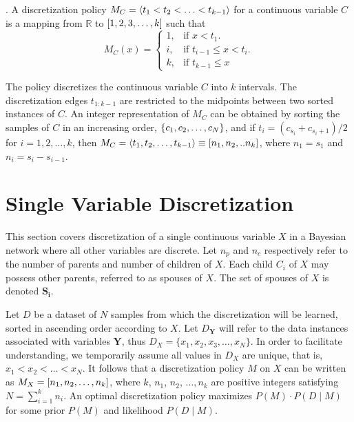 .
A discretization policy $M_C = \langle t_1 < t_2 < \ldots < t_{k-1} \rangle$ for a continuous variable $C$ is a mapping from $\mathbb{R}$ to $\brock{1,2,3,\ldots,k}$ such that
\begin{equation}
  M_C (x)=\begin{cases}
    1, & \text{if $x<t_1$}.\\
    i, & \text{if $t_{i-1} \leq x < t_i$}\text{.}\\
    k, & \text{if $t_{k-1} \leq x$}
  \end{cases}
\end{equation}

\noindent
The policy discretizes the continuous variable $C$ into $k$ intervals.
The discretization edges $t_{1:k-1}$ are restricted to the midpoints between two sorted instances of $C$.
An integer representation of $M_C$ can be obtained by sorting the samples of $C$ in an increasing order, $\curly{c_1,c_2,\ldots,c_N}$, and if $t_i = (c_{s_{i}} + c_{s_{i}+1})/2$ for $i=1,2,\ldots,k$, then $M_C = \anglebrackets{t_1,t_2, \ldots, t_{k-1}} \equiv \brock{n_1,n_2,..n_k}$, where $n_1 = s_1$ and $n_i = s_{i} - s_{i-1}$.


\section{Single Variable Discretization}
\label{sec:single_var}

This section covers discretization of a single continuous variable $X$ in a Bayesian network where all other variables are discrete.
Let $n_p$ and $n_c$ respectively refer to the number of parents and number of children of $X$.
Each child $C_i$ of $X$ may possess other parents, referred to as spouses of $X$.
The set of spouses of $X$ is denoted $\boldsymbol{S_i}$.

Let $D$ be a dataset of $N$ samples from which the discretization will be learned, sorted in ascending order according to $X$.
Let $D_{\boldsymbol{Y}}$ will refer to the data instances associated with variables $\boldsymbol{Y}$, thus $D_X = \{ x_1,x_2,x_3,\ldots,x_N \}$.
In order to facilitate understanding, we temporarily assume all values in $D_X$ are unique, that is, $x_1 < x_2 < \ldots < x_N$.
It follows that a discretization policy $M$ on $X$ can be written as $M_X = \brock{n_1,n_2,\ldots,n_k}$, where $k$, $n_1$, $n_2$, $\ldots,n_k$ are positive integers satisfying $N = \sum_{i=1}^k n_i$.
An optimal discretization policy maximizes $P(M)\cdot P(D\mid M)$ for some prior $P(M)$ and likelihood $P(D\mid M)$.

